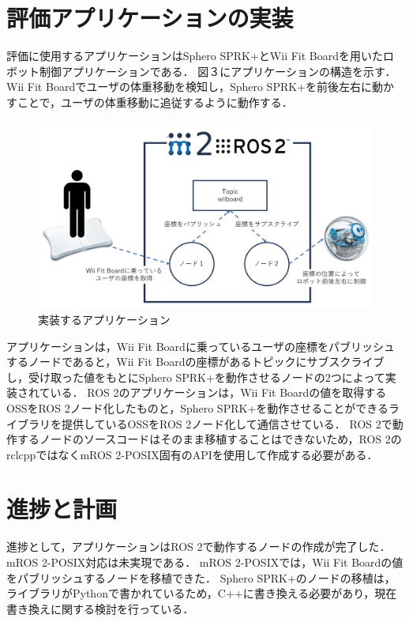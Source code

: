 \documentclass[11pt]{ujarticle}
\begin{document}
\section{評価アプリケーションの実装}
評価に使用するアプリケーションはSphero SPRK+とWii Fit Boardを用いたロボット制御アプリケーションである．
図３にアプリケーションの構造を示す．
Wii Fit Boardでユーザの体重移動を検知し，Sphero SPRK+を前後左右に動かすことで，ユーザの体重移動に追従するように動作する．
\begin{figure}[t]
	\centering
	\includegraphics[width=0.9\linewidth]{./src/fig3_application_structure.png}
	\caption{実装するアプリケーション}
  \label{fig:arch}
\end{figure}
アプリケーションは，Wii Fit Boardに乗っているユーザの座標をパブリッシュするノードであると，Wii Fit Boardの座標があるトピックにサブスクライブし，受け取った値をもとにSphero SPRK+を動作させるノードの2つによって実装されている．
ROS 2のアプリケーションは，Wii Fit Boardの値を取得するOSSをROS 2ノード化したものと，Sphero SPRK+を動作させることができるライブラリを提供しているOSSをROS 2ノード化して通信させている．
ROS 2で動作するノードのソースコードはそのまま移植することはできないため，ROS 2のrclcppではなくmROS 2-POSIX固有のAPIを使用して作成する必要がある．


\section{進捗と計画}
進捗として，アプリケーションはROS 2で動作するノードの作成が完了した．
mROS 2-POSIX対応は未実現である．
mROS 2-POSIXでは，Wii Fit Boardの値をパブリッシュするノードを移植できた．
Sphero SPRK+のノードの移植は，ライブラリがPythonで書かれているため，C++に書き換える必要があり，現在書き換えに関する検討を行っている．
\end{document}
